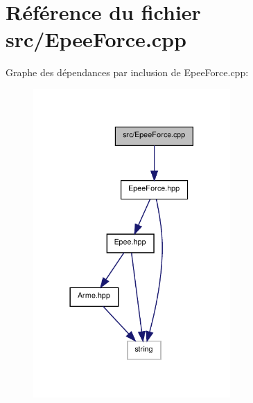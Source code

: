 \section{Référence du fichier src/\-Epee\-Force.cpp}
\label{_epee_force_8cpp}
Graphe des dépendances par inclusion de Epee\-Force.\-cpp\-:\nopagebreak
\begin{figure}[H]
\begin{center}
\leavevmode
\includegraphics[width=213pt]{_epee_force_8cpp__incl}
\end{center}
\end{figure}
